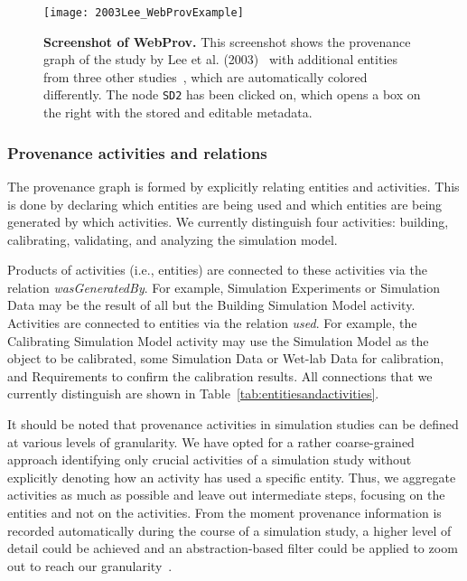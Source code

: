 \documentclass[10pt,letterpaper]{article}
\newcommand{\lee}{Lee et al. (2003)}
\newcommand{\Rs}{Requirements}
\newcommand{\SM}{Simulation Model}
\newcommand{\SEs}{Simulation Experiments}
\newcommand{\SD}{Simulation Data}
\newcommand{\WD}{Wet-lab Data}
\newcommand{\BSM}{Building Simulation Model}
\newcommand{\CSM}{Calibrating Simulation Model}
\begin{document}
\begin{figure}[!h]%
\begin{adjustwidth}{-2.25in}{0in}
\centering
\texttt{[image: 2003Lee\_WebProvExample]}
\caption{{\bf Screenshot of WebProv.}
This screenshot shows the provenance graph of the study by \lee{}~\cite{Lee2003} with additional entities from three other studies~\cite{Lee2001, Dajani2003, Salic2000}, which are automatically colored differently.
The node \texttt{SD2} has been clicked on, which opens a box on the right with the stored and editable metadata.}
\label{fig:WebProvLee}
\end{adjustwidth}
\end{figure}


\subsubsection*{Provenance activities and relations}

The provenance graph is formed by explicitly relating entities and activities.
This is done by declaring which entities are being used and which entities are being generated by which activities.
We currently distinguish four activities: building, calibrating, validating, and analyzing the simulation model.

Products of activities (i.e., entities) are connected to these activities via the relation \textit{wasGeneratedBy}.
For example, \SEs{} or \SD{} may be the result of all but the \BSM{} activity.
Activities are connected to entities via the relation \textit{used}.
For example, the \CSM{} activity may use the \SM{} as the object to be calibrated, some \SD{} or \WD{} for calibration, and \Rs{} to confirm the calibration results.
All connections that we currently distinguish are shown in Table~\ref{tab:entitiesandactivities}.

It should be noted that provenance activities in simulation studies can be defined at various levels of granularity.
We have opted for a rather coarse-grained approach identifying only crucial activities of a simulation study without explicitly denoting how an activity has used a specific entity.
Thus, we aggregate activities as much as possible and leave out intermediate steps, focusing on the entities and not on the activities.
From the moment provenance information is recorded automatically during the course of a simulation study, a higher level of detail could be achieved and an abstraction-based filter could be applied to zoom out to reach our granularity~\cite{Ruscheinski2019}.
\end{document}
